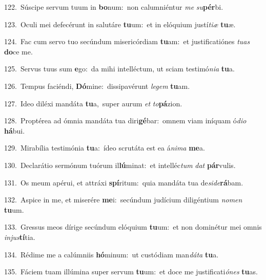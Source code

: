 {\numbfont\textcolor{\numbcolor}{122.}}~Súscipe servum tuum in \textbf{bo}\-num:~\star non calumniéntur \textit{me} \textit{su}\-\textbf{pér}bi.\par
{\numbfont\textcolor{\numbcolor}{123.}}~Oculi mei defecérunt in salutáre \textbf{tu}\-um:~\star et in elóquium justí\-\textit{ti}\-\textit{æ} \textbf{tu}\-æ.\par
{\numbfont\textcolor{\numbcolor}{124.}}~Fac cum servo tuo secúndum misericórdiam \textbf{tu}\-am:~\star et justificatiónes \textit{tu}\-\textit{as} \textbf{do}\-ce me.\par
{\numbfont\textcolor{\numbcolor}{125.}}~Servus tuus sum \textbf{e}\-go:~\star da mihi intelléctum, ut sciam testimó\-\textit{ni}\-\textit{a} \textbf{tu}\-a.\par
{\numbfont\textcolor{\numbcolor}{126.}}~Tempus faciéndi, \textbf{Dó}\-mine:~\star dissipavérunt \textit{le}\-\textit{gem} \textbf{tu}\-am.\par
{\numbfont\textcolor{\numbcolor}{127.}}~Ideo diléxi mandáta \textbf{tu}\-a,~\star super aurum \textit{et} \textit{to}\-\textbf{pá}zion.\par
{\numbfont\textcolor{\numbcolor}{128.}}~Proptérea ad ómnia mandáta tua diri\-\textbf{gé}\-bar:~\star omnem viam iníquam ó\-\textit{di}\-\textit{o} \textbf{há}\-bui.\par
{\numbfont\textcolor{\numbcolor}{129.}}~Mirabília testimónia \textbf{tu}\-a:~\star ídeo scrutáta est ea á\-\textit{ni}\-\textit{ma} \textbf{me}\-a.\par
{\numbfont\textcolor{\numbcolor}{130.}}~Declarátio sermónum tuórum il\-\textbf{lú}\-minat:~\star et intelléc\textit{tum} \textit{dat} \textbf{pár}\-vulis.\par
{\numbfont\textcolor{\numbcolor}{131.}}~Os meum apérui, et attráxi \textbf{spí}\-ritum:~\star quia mandáta tua de\-\textit{si}\-\textit{de}\textbf{rá}bam.\par
{\numbfont\textcolor{\numbcolor}{132.}}~Aspice in me, et miserére \textbf{me}\-i:~\star secúndum judícium diligéntium \textit{no}\-\textit{men} \textbf{tu}\-um.\par
{\numbfont\textcolor{\numbcolor}{133.}}~Gressus meos dírige secúndum elóquium \textbf{tu}\-um:~\star et non dominétur mei omnis \textit{in}\-\textit{jus}\textbf{tí}tia.\par
{\numbfont\textcolor{\numbcolor}{134.}}~Rédime me a calúmniis \textbf{hó}\-minum:~\star ut custódiam man\-\textit{dá}\-\textit{ta} \textbf{tu}\-a.\par
{\numbfont\textcolor{\numbcolor}{135.}}~Fáciem tuam illúmina super servum \textbf{tu}\-um:~\star et doce me justificati\-\textit{ó}\-\textit{nes} \textbf{tu}\-as.\par
